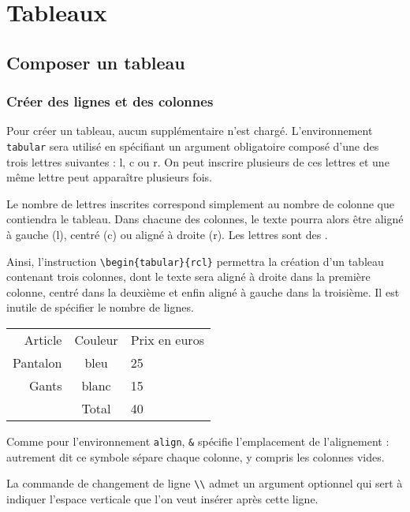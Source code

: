 \chapter{Tableaux}\label{tableaux}

\section{Composer un tableau}
\subsection{Créer des lignes et des colonnes}

Pour créer un tableau, aucun  supplémentaire n'est chargé.
L'environnement \texttt{tabular} sera utilisé en spécifiant un argument obligatoire composé d'une des trois lettres suivantes : \ordi l, \ordi c ou \ordi r. On peut inscrire plusieurs de ces lettres et une même lettre peut apparaître plusieurs fois.

Le nombre de lettres inscrites correspond simplement au nombre de colonne que contiendra le tableau. Dans chacune des colonnes, le texte pourra alors être aligné à gauche (\ordi l), centré (\ordi c) ou aligné à droite (\ordi r). Les lettres sont des .

Ainsi, l'instruction \texttt{\textbackslash begin\{tabular\}\{rcl\}} permettra la création d'un tableau contenant trois colonnes, dont le texte sera aligné à droite dans la première colonne, centré dans la deuxième et enfin aligné à gauche dans la troisième. Il est inutile de spécifier le nombre de lignes.\bigskip


\begin{SideBySideExample}
    \begin{tabular}{rcl}
        Article & Couleur & Prix en euros \\[0.5cm]
        Pantalon & bleu & 25 \\
        Gants & blanc & 15 \\
            & Total & 40
    \end{tabular}
\end{SideBySideExample}
\bigskip

Comme pour l'environnement \texttt{align}, \verb!&! spécifie l'emplacement de l'alignement : autrement dit ce symbole sépare chaque colonne, y compris les colonnes vides.

La commande de changement de ligne \verb!\\! admet un argument optionnel qui sert à indiquer l'espace verticale que l'on veut insérer après cette ligne.

